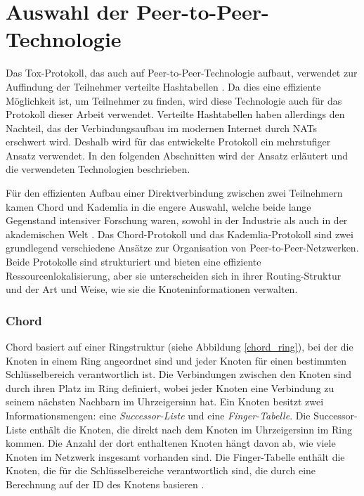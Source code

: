 \section{Auswahl der Peer-to-Peer-Technologie}
\label{sec:grundlagen_des_protokolls}

Das Tox-Protokoll, das auch auf Peer-to-Peer-Technologie aufbaut, verwendet zur Auffindung der Teilnehmer verteilte Hashtabellen \Parencite{tox_spec}. Da dies eine effiziente Möglichkeit ist, um Teilnehmer zu finden, wird diese Technologie auch für das Protokoll dieser Arbeit verwendet. Verteilte Hashtabellen haben allerdings den Nachteil, das der Verbindungsaufbau im modernen Internet durch NATs erschwert wird. Deshalb wird für das entwickelte Protokoll ein mehrstufiger Ansatz verwendet. In den folgenden Abschnitten wird der Ansatz erläutert und die verwendeten Technologien beschrieben.

Für den effizienten Aufbau einer Direktverbindung zwischen zwei Teilnehmern kamen Chord und Kademlia in die engere Auswahl, welche beide lange Gegenstand intensiver Forschung waren, sowohl in der Industrie als auch in der akademischen Welt \parencite[S. 808]{MedranoChavez_ChordKademliaHighChurnScenarios}. 
Das Chord-Protokoll und das Kademlia-Protokoll sind zwei grundlegend verschiedene Ansätze zur Organisation von Peer-to-Peer-Netzwerken. Beide Protokolle sind strukturiert und bieten eine effiziente Ressourcenlokalisierung, aber sie unterscheiden sich in ihrer Routing-Struktur und der Art und Weise, wie sie die Knoteninformationen verwalten.

\subsubsection{Chord}
Chord basiert auf einer Ringstruktur (siehe Abbildung \ref{chord_ring}), bei der die Knoten in einem Ring angeordnet sind und jeder Knoten für einen bestimmten Schlüsselbereich verantwortlich ist. Die Verbindungen zwischen den Knoten sind durch ihren Platz im Ring definiert, wobei jeder Knoten eine Verbindung zu seinem nächsten Nachbarn im Uhrzeigersinn hat. Ein Knoten besitzt zwei Informationsmengen: eine \textit{Successor-Liste} und eine \textit{Finger-Tabelle}. Die Successor-Liste enthält die Knoten, die direkt nach dem Knoten im Uhrzeigersinn im Ring kommen. Die Anzahl der dort enthaltenen Knoten hängt davon ab, wie viele Knoten im Netzwerk insgesamt vorhanden sind. Die Finger-Tabelle enthält die Knoten, die für die Schlüsselbereiche verantwortlich sind, die durch eine Berechnung auf der ID des Knotens basieren \Parencite[S. 810-811]{MedranoChavez_ChordKademliaHighChurnScenarios}.

